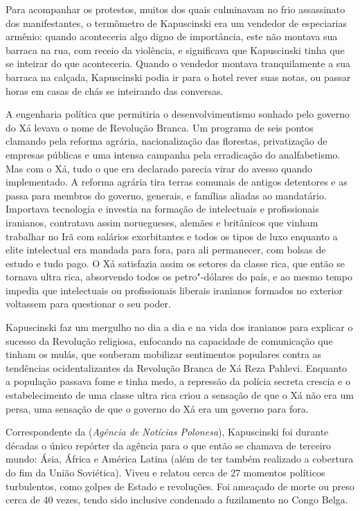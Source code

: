 Para acompanhar os protestos, muitos dos quais culminavam no frio
assassinato dos manifestantes, o termômetro de Kapuscinski era um
vendedor de especiarias armênio: quando aconteceria algo digno de
importância, este não montava sua barraca na rua, com receio da
violência, e significava que Kapuscinski tinha que se inteirar do que
aconteceria. Quando o vendedor montava tranquilamente a sua barraca na
calçada, Kapuscinski podia ir para o hotel rever suas notas, ou passar
horas em casas de chás se inteirando das conversas.

A engenharia política que permitiria o desenvolvimentismo sonhado pelo
governo do Xá levava o nome de Revolução Branca. Um programa de seis
pontos clamando pela reforma agrária, nacionalização das florestas,
privatização de empresas públicas e uma intensa campanha pela
erradicação do analfabetismo. Mas com o Xá, tudo o que era declarado
parecia virar do avesso quando implementado. A reforma agrária tira
terras comunais de antigos detentores e as passa para membros do
governo, generais, e famílias aliadas ao mandatário. Importava
tecnologia e investia na formação de intelectuais e profissionais
iranianos, contratava assim noruegueses, alemães e britânicos que
vinham trabalhar no Irã com salários exorbitantes e todos os tipos de
luxo enquanto a elite intelectual era mandada para fora, para ali
permanecer, com bolsas de estudo e tudo pago. O Xá satisfazia assim os setores da
classe rica, que então se tornava ultra rica, absorvendo todos os
petro"-dólares do país, e ao mesmo tempo impedia que intelectuais ou
profissionais liberais iranianos formados no exterior voltassem para
questionar o seu poder.

Kapuscinski faz um mergulho no dia a dia e na vida dos iranianos para
explicar o sucesso da Revolução religiosa, enfocando na capacidade de
comunicação que tinham os mulás, que souberam mobilizar sentimentos
populares contra as tendências ocidentalizantes da Revolução Branca de
Xá Reza Pahlevi. Enquanto a população passava fome e tinha medo, a
repressão da polícia secreta crescia e o estabelecimento de uma classe
ultra rica criou a sensação de que o Xá não era um persa, uma sensação
de que o governo do Xá era um governo para fora.

\asterisc

Correspondente da  (\emph{Agência de Notícias Polonesa}), Kapuscinski foi
durante décadas o único repórter da agência para o que então se chamava
de terceiro mundo: Ásia, África e América Latina (além de ter também
realizado a cobertura do fim da União Soviética). Viveu e relatou cerca
de 27 momentos políticos turbulentos, como golpes de Estado e
revoluções. Foi ameaçado de morte ou preso cerca de 40 vezes, tendo sido
inclusive condenado a fuzilamento no Congo Belga.

